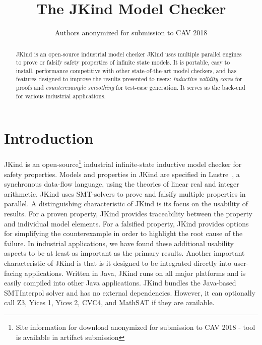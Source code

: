 \documentclass{llncs}
\title{The JKind Model Checker}
\author{ Authors anonymized for submission to CAV 2018
  }
\institute{ Institute anonymized for submission to CAV 2018
}
\newcommand{\jkind}{{\sc JKind}\xspace}
\newcommand{\lustre}{{\sc Lustre}\xspace}
\newcommand{\yices}{{\sc Yices}\xspace}
\newcommand{\zthree}{{\sc Z3}\xspace}
\begin{document}
\maketitle

\begin{abstract}
  \jkind is an open-source industrial model checker
  \jkind uses
  multiple parallel engines to prove or falsify safety properties of
  infinite state models. It is portable, easy to install, performance competitive with other state-of-the-art model checkers, and has features designed to improve the results presented to users: {\em inductive validity cores} for proofs and {\em counterexample smoothing} for test-case generation.  It serves as the back-end for
  various industrial applications.
\end{abstract}

\section{Introduction}

\jkind is an
open-source\footnote{Site information for download anonymized for submission to CAV 2018 - tool is available in artifact submission %
} industrial
infinite-state inductive model checker for safety properties. Models
and properties in \jkind are specified in
\lustre~\cite{halbwachs1991ieee}, a synchronous data-flow language,
using the theories of linear real and integer arithmetic. \jkind uses
SMT-solvers to prove and falsify multiple properties in parallel.
%
A distinguishing characteristic of \jkind is its focus on the usability  of results. For a proven property, \jkind provides traceability between the property and individual model elements. For a falsified property, \jkind provides options for simplifying the
counterexample in order to highlight the root cause of the failure. In industrial applications, we have found these additional usability aspects to be at least as important as the primary results.
%
Another important characteristic of \jkind is that is it designed to be integrated directly into user-facing applications. Written in Java, \jkind runs on all major platforms and is easily compiled into other Java applications. \jkind bundles the Java-based {\sc SMTInterpol} solver and has no external dependencies. However, it can optionally call \zthree, \yices 1, \yices 2, {\sc CVC4}, and {\sc
  MathSAT} if they are available.
\end{document}
